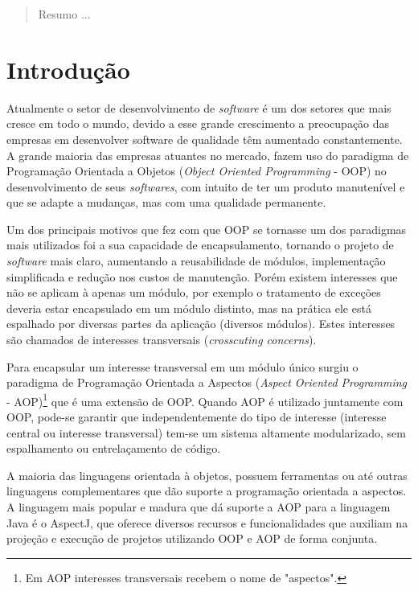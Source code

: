 \documentclass[tc,oneside]{iiufrgs}
\begin{document}
\listoffigures

\listoftables

\begin{abstract}

Resumo ...

\end{abstract}


\chapter{Introdução}
\label{cap1}
Atualmente o setor de desenvolvimento de \textit{software} é um dos setores que mais cresce em todo o mundo, devido a esse grande crescimento a preocupação das empresas em desenvolver software de qualidade têm aumentado constantemente. A grande maioria das empresas atuantes no mercado, fazem uso do paradigma de Programação Orientada a Objetos (\textit{Object Oriented Programming} - OOP) no desenvolvimento de seus \textit{softwares}, com intuito de ter um produto manutenível e que se adapte a mudanças, mas com uma qualidade permanente.

Um dos principais motivos que fez com que OOP se tornasse um dos paradigmas mais utilizados foi a sua capacidade de encapsulamento, tornando o projeto de \textit{software} mais claro, aumentando a reusabilidade de módulos, implementação simplificada e redução nos custos de manutenção. Porém existem interesses que não se aplicam à apenas um módulo, por exemplo o tratamento de exceções deveria estar encapsulado em um módulo distinto, mas na prática ele está espalhado por diversas partes da aplicação (diversos módulos). Estes interesses são chamados de interesses transversais (\textit{crosscuting concerns}).

Para encapsular um interesse transversal em um módulo único surgiu o paradigma de Programação Orientada a Aspectos (\textit{Aspect Oriented Programming} - AOP)\footnote{Em AOP interesses transversais recebem o nome de "aspectos".} que é uma extensão de OOP. Quando AOP é utilizado juntamente com OOP, pode-se garantir que independentemente do tipo de interesse (interesse central ou interesse transversal) tem-se um sistema altamente modularizado, sem espalhamento ou entrelaçamento de código.

A maioria das linguagens orientada à objetos, possuem ferramentas ou até outras linguagens complementares que dão suporte a programação orientada a aspectos. A linguagem mais popular e madura que dá suporte a AOP para a linguagem Java é o AspectJ, que oferece diversos recursos e funcionalidades que auxiliam na projeção e execução de projetos utilizando OOP e AOP de forma conjunta.
\end{document}
